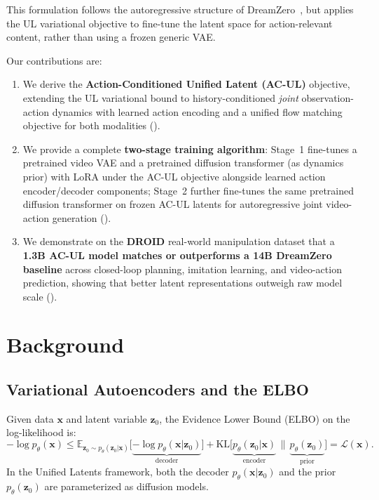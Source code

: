 \documentclass{article}
\newcommand{\vx}{\bm{x}}
\newcommand{\vz}{\bm{z}}
\newcommand{\E}{\mathbb{E}}
\newcommand{\KL}{\mathrm{KL}}
\newcommand{\loss}{\mathcal{L}}
\begin{document}
This formulation follows the autoregressive structure of DreamZero~\citep{dreamzero2025}, but applies the UL variational objective to fine-tune the latent space for action-relevant content, rather than using a frozen generic VAE.

Our contributions are:
\begin{enumerate}[leftmargin=*,itemsep=2pt]
  \item We derive the \textbf{Action-Conditioned Unified Latent (AC-UL)} objective, extending the UL variational bound to history-conditioned \emph{joint} observation-action dynamics with learned action encoding and a unified flow matching objective for both modalities ().
  \item We provide a complete \textbf{two-stage training algorithm}: Stage~1 fine-tunes a pretrained video VAE and a pretrained diffusion transformer (as dynamics prior) with LoRA under the AC-UL objective alongside learned action encoder/decoder components; Stage~2 further fine-tunes the same pretrained diffusion transformer on frozen AC-UL latents for autoregressive joint video-action generation ().
  \item We demonstrate on the \textbf{DROID} real-world manipulation dataset that a \textbf{1.3B AC-UL model matches or outperforms a 14B DreamZero baseline} across closed-loop planning, imitation learning, and video-action prediction, showing that better latent representations outweigh raw model scale ().
\end{enumerate}

\section{Background}
\label{sec:background}

\subsection{Variational Autoencoders and the ELBO}

Given data $\vx$ and latent variable $\vz_0$, the Evidence Lower Bound (ELBO) on the log-likelihood is:
\begin{equation}
  -\log p_\theta(\vx) \leq \E_{\vz_0 \sim p_\theta(\vz_0|\vx)}\!\Big[\underbrace{-\log p_\theta(\vx|\vz_0)}_{\text{decoder}}\Big] + \KL\!\Big[\underbrace{p_\theta(\vz_0|\vx)}_{\text{encoder}} \,\Big\|\, \underbrace{p_\theta(\vz_0)}_{\text{prior}}\Big] = \loss(\vx).
  \label{eq:elbo}
\end{equation}
In the Unified Latents framework, both the decoder $p_\theta(\vx|\vz_0)$ and the prior $p_\theta(\vz_0)$ are parameterized as diffusion models.
\end{document}

